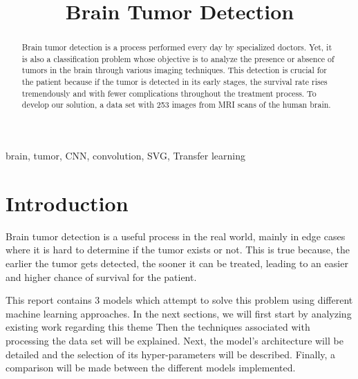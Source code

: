 \documentclass[conference]{IEEEtran}
\begin{document}
\title{Brain Tumor Detection}

\author{
\and
{}
\and
{}
}

\maketitle

\begin{abstract}
Brain tumor detection is a process performed every day by specialized doctors. Yet, it is also a classification problem whose objective is to analyze the presence or absence of tumors in the brain through various imaging techniques. This detection is crucial for the patient because if the tumor is detected in its early stages, the survival rate rises tremendously and with fewer complications throughout the treatment process. To develop our solution, a data set with 253 images from MRI scans of the human brain.
\end{abstract}

\begin{IEEEkeywords}
brain, tumor, CNN, convolution, SVG, Transfer learning
\end{IEEEkeywords}

\section{Introduction}
Brain tumor detection is a useful process in the real world, mainly in edge cases where it is hard to determine if the tumor exists or not. This is true because, the earlier the tumor gets detected, the sooner it can be treated, leading to an easier and higher chance of survival for the patient.

This report contains 3 models which attempt to solve this problem using different machine learning approaches. In the next sections, we will first start by analyzing existing work regarding this theme Then the techniques associated with processing the data set will be explained. Next, the model's architecture will be detailed and the selection of its hyper-parameters will be described. Finally, a comparison will be made between the different models implemented.
\end{document}

